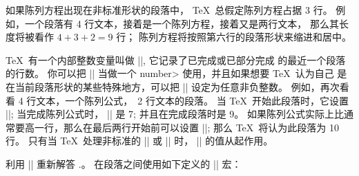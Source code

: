 \ddanger 如果陈列方程出现在非标准形状的段落中， \TeX\ 总假定陈列方程占据 3 行。%
例如，一个段落有 4 行文本，接着是一个陈列方程，接着又是两行文本，
那么其长度将被看作 $4+3+2=9$ 行；
陈列方程将按照第六行的段落形状来缩进和居中。

\ddanger  \TeX\ 有一个内部整数变量叫做 |\prevgraf|, 它记录了已完成或已部分完成%
的最近一个段落的行数。%
你可以把 |\prevgraf| 当做一个 \<number> 使用，并且如果想要 \TeX\ 认为自己%
是在当前段落形状的某些特殊地方，可以把 |\prevgraf| 设定为任意非负整数。%
例如，再次看看 4 行文本，一个陈列公式，~2 行文本的段落。%
当 \TeX\ 开始此段落时，它设置 ||; 当完成陈列公式时，
|\prevgraf| 是 7; 并且在完成段落时是 9。%
如果陈列公式实际上比通常要高一行，那么在最后两行开始前可以设置 ||;
那么 \TeX\ 将认为此段落为 10 行。%
只有当 \TeX\ 处理非标准的 |\parshape| 或 |\hangindent| 时，
|\prevgraf| 的值从起作用。

\edef\lastex{\chapno.\the\exno}
\ddangerexercise 利用 |\prevgraf| 重新解答 \lastex。
\answer 在段落之间使用如下定义的 |\hangcarryover| 宏：
\begintt
\def\hangcarryover{\edef\next{\hangafter=\the\hangafter
    \hangindent=\the\hangindent}
  \par\next
  \edef\next{\prevgraf=\the\prevgraf}
  \indent\next}
\endtt

